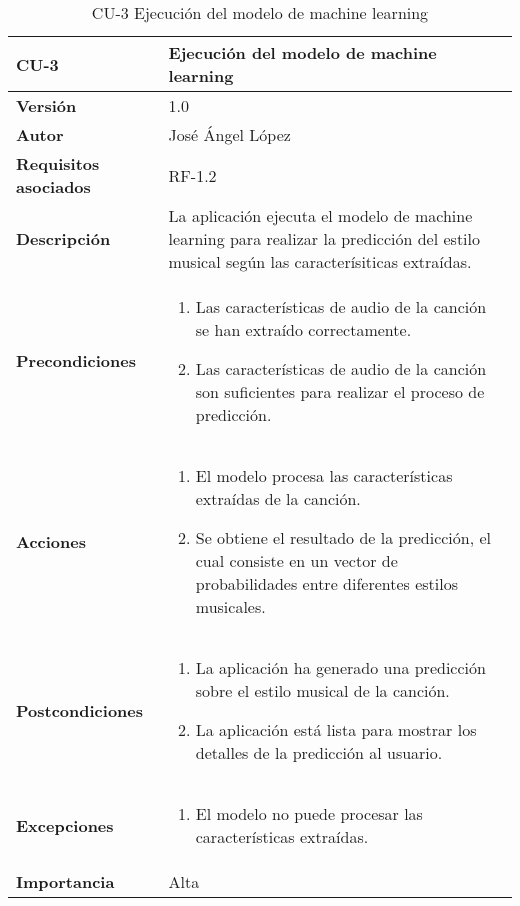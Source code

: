 \begin{table}[p]
	\centering
	\begin{tabularx}{\linewidth}{ p{} p{} }
		\toprule
		\textbf{CU-3}    & \textbf{Ejecución del modelo de machine learning}\\
		\toprule
		\textbf{Versión}              & 1.0    \\
		\textbf{Autor}                & José Ángel López \\
		\textbf{Requisitos asociados} & RF-1.2 \\
		\textbf{Descripción}          & La aplicación ejecuta el modelo de machine learning para realizar la predicción del estilo musical según las caracterísiticas extraídas. \\
		\textbf{Precondiciones}        & 
		\begin{enumerate}		    
			\def\labelenumi{\arabic{enumi}.}
			\tightlist
			\item Las características de audio de la canción se han extraído correctamente.
			\item Las características de audio de la canción son suficientes para realizar el proceso de predicción.
		\end{enumerate}\\
		\textbf{Acciones}             &
		\begin{enumerate}
			\def\labelenumi{\arabic{enumi}.}
			\tightlist
			\item El modelo procesa las características extraídas de la canción.
			\item Se obtiene el resultado de la predicción, el cual consiste en un vector de probabilidades entre diferentes estilos musicales.
		\end{enumerate}\\
		\textbf{Postcondiciones} &
		\begin{enumerate}
			\def\labelenumi{\arabic{enumi}.}
			\tightlist
			\item La aplicación ha generado una predicción sobre el estilo musical de la canción.
			\item La aplicación está lista para mostrar los detalles de la predicción al usuario.
		\end{enumerate}\\
		\textbf{Excepciones} &
		\begin{enumerate}
			\def\labelenumi{\arabic{enumi}.}
			\tightlist
			\item El modelo no puede procesar las características extraídas.
		\end{enumerate}\\
		\textbf{Importancia}          & Alta \\
		\bottomrule
	\end{tabularx}
	\caption{CU-3 Ejecución del modelo de machine learning}
\end{table}